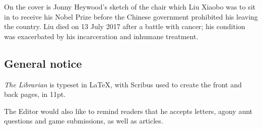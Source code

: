 On the cover is Jonny Heywood's sketch of the chair which Liu Xiaobo was to sit in to receive his Nobel Prize before the Chinese government prohibited his leaving the country. Liu died on 13 July 2017 after a battle with cancer; his condition was exacerbated by his incarceration and inhumane treatment.



\subsection{General notice}

\textit{The Librarian} is typeset in \LaTeX, with Scribus used to create the front and back pages, in 11pt.

The Editor would also like to remind readers that he accepts letters, agony aunt questions and game submissions, as well as articles.
